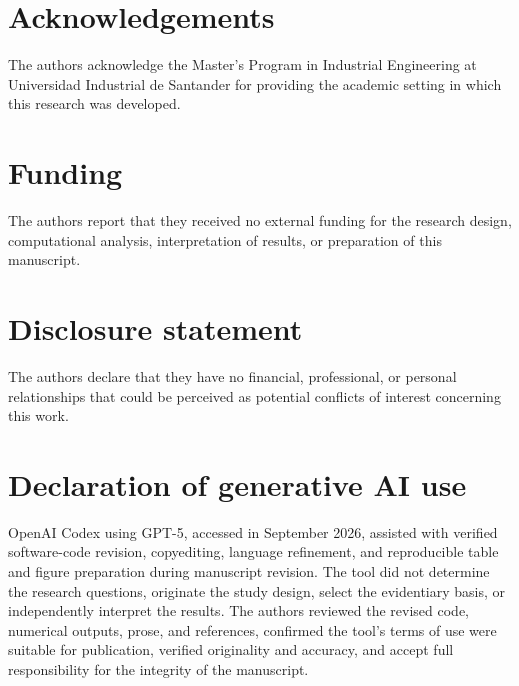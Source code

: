 \documentclass[]{interact}
\begin{document}
\section*{Acknowledgements}

The authors acknowledge the Master's Program in Industrial Engineering at Universidad Industrial de Santander for providing the academic setting in which this research was developed.

\section*{Funding}

The authors report that they received no external funding for the research design, computational analysis, interpretation of results, or preparation of this manuscript.

\section*{Disclosure statement}

The authors declare that they have no financial, professional, or personal relationships that could be perceived as potential conflicts of interest concerning this work.

\section*{Declaration of generative AI use}

OpenAI Codex using GPT-5, accessed in September 2026, assisted with verified software-code revision, copyediting, language refinement, and reproducible table and figure preparation during manuscript revision. The tool did not determine the research questions, originate the study design, select the evidentiary basis, or independently interpret the results. The authors reviewed the revised code, numerical outputs, prose, and references, confirmed the tool's terms of use were suitable for publication, verified originality and accuracy, and accept full responsibility for the integrity of the manuscript.
\end{document}
